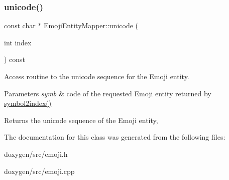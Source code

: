 \subsubsection{\texorpdfstring{unicode()}{unicode()}}
{\footnotesize\ttfamily const char $\ast$ Emoji\+Entity\+Mapper\+::unicode (\begin{DoxyParamCaption}\item[{int}]{index }\end{DoxyParamCaption}) const}



Access routine to the unicode sequence for the Emoji entity. 


\begin{DoxyParams}{Parameters}
{\em symb} & code of the requested Emoji entity returned by \mbox{\hyperlink{class_emoji_entity_mapper_a48541059ca5ed1d155c65e4b6b69fe24}{symbol2index()}} \\
\hline
\end{DoxyParams}
\begin{DoxyReturn}{Returns}
the unicode sequence of the Emoji entity, 
\end{DoxyReturn}


The documentation for this class was generated from the following files\+:\begin{DoxyCompactItemize}
\item 
doxygen/src/emoji.\+h\item 
doxygen/src/emoji.\+cpp\end{DoxyCompactItemize}
